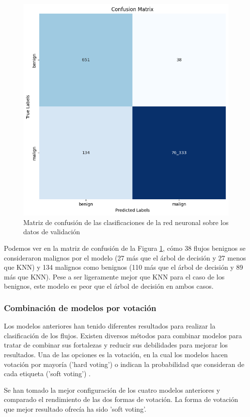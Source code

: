 \begin{figure}[H]
    \begin{center}
        \includegraphics[width=0.55\linewidth]{media/packet_pincer_train_models_nn.png}
    \end{center}
    \caption{Matriz de confusión de las clasificaciones de la red neuronal sobre los datos de validación}\label{fig:nnmatrix}
\end{figure}

Podemos ver en la matriz de confusión de la Figura \ref{fig:nnmatrix}, cómo 38 flujos benignos se consideraron malignos por el modelo (27 más que el árbol de decisión y 27 menos que KNN) y 134 malignos como benignos (110 más que el árbol de decisión y 89 más que KNN). Pese a ser ligeramente mejor que KNN para el caso de los benignos, este modelo es peor que el árbol de decisión en ambos casos.

\subsubsection{Combinación de modelos por votación}

Los modelos anteriores han tenido diferentes resultados para realizar la clasificación de los flujos. Existen diversos métodos para combinar modelos para tratar de combinar sus fortalezas y reducir sus debilidades para mejorar los resultados. Una de las opciones es la votación, en la cual los modelos hacen votación por mayoría ('hard voting') o indican la probabilidad que consideran de cada etiqueta ('soft voting') \cite{sklearnvotingclassifier}.

Se han tomado la mejor configuración de los cuatro modelos anteriores y comparado el rendimiento de las dos formas de votación. La forma de votación que mejor resultado ofrecía ha sido 'soft voting'.

